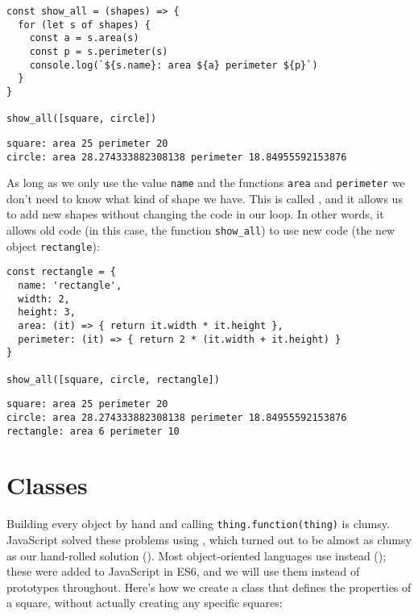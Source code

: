 \begin{verbatim}
const show_all = (shapes) => {
  for (let s of shapes) {
    const a = s.area(s)
    const p = s.perimeter(s)
    console.log(`${s.name}: area ${a} perimeter ${p}`)
  }
}

show_all([square, circle])
\end{verbatim}

\begin{verbatim}
square: area 25 perimeter 20
circle: area 28.274333882308138 perimeter 18.84955592153876
\end{verbatim}

As long as we only use the value \texttt{name} and the functions \texttt{area} and \texttt{perimeter}
we don't need to know what kind of shape we have.
This is called ,
and it allows us to add new shapes without changing the code in our loop.
In other words,
it allows old code (in this case, the function \texttt{show\_all})
to use new code (the new object \texttt{rectangle}):

\begin{verbatim}
const rectangle = {
  name: 'rectangle',
  width: 2,
  height: 3,
  area: (it) => { return it.width * it.height },
  perimeter: (it) => { return 2 * (it.width + it.height) }
}

show_all([square, circle, rectangle])
\end{verbatim}

\begin{verbatim}
square: area 25 perimeter 20
circle: area 28.274333882308138 perimeter 18.84955592153876
rectangle: area 6 perimeter 10
\end{verbatim}

\section{Classes}\label{s:oop-classes}

Building every object by hand and calling \texttt{thing.function(thing)} is clumsy.
JavaScript solved these problems using ,
which turned out to be almost as clumsy as our hand-rolled solution ().
Most object-oriented languages use  instead ();
these were added to JavaScript in ES6,
and we will use them instead of prototypes throughout.
Here's how we create a class that defines the properties of a square,
without actually creating any specific squares:

